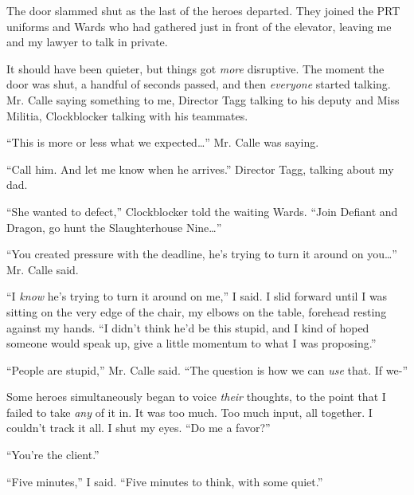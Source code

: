 





The door slammed shut as the last of the heroes departed.  They joined the PRT uniforms and Wards who had gathered just in front of the elevator, leaving me and my lawyer to talk in private.



It should have been quieter, but things got \emph{more} disruptive.  The moment the door was shut, a handful of seconds passed, and then \emph{everyone} started talking.  Mr. Calle saying something to me, Director Tagg talking to his deputy and Miss Militia, Clockblocker talking with his teammates.



``This is more or less what we expected\ldots'' Mr. Calle was saying.



``Call him.  And let me know when he arrives.'' Director Tagg, talking about my dad.



``She wanted to defect,'' Clockblocker told the waiting Wards.  ``Join Defiant and Dragon, go hunt the Slaughterhouse Nine\ldots''



``You created pressure with the deadline, he's trying to turn it around on you\ldots'' Mr. Calle said.



``I \emph{know} he's trying to turn it around on me,'' I said.  I slid forward until I was sitting on the very edge of the chair, my elbows on the table, forehead resting against my hands.  ``I didn't think he'd be this stupid, and I kind of hoped someone would speak up, give a little momentum to what I was proposing.''



``People are stupid,'' Mr. Calle said.  ``The question is how we can \emph{use} that.  If we-''



Some heroes simultaneously began to voice \emph{their} thoughts, to the point that I failed to take \emph{any} of it in.  It was too much.  Too much input, all together.  I couldn't track it all.  I shut my eyes.  ``Do me a favor?''



``You're the client.''



``Five minutes,'' I said.  ``Five minutes to think, with some quiet.''




